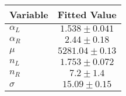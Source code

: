 \begin{tabular}[t]{lc}
\hline
Variable &Fitted Value\\
\hline\hline
$\alpha_L$&$1.538\pm0.041$\\
\hline
$\alpha_R$&$2.44\pm0.18$\\
\hline
$\mu$&$5281.04\pm0.13$\\
\hline
$n_L$&$1.753\pm0.072$\\
\hline
$n_R$&$7.2\pm1.4$\\
\hline
$\sigma$&$15.09\pm0.15$\\
\hline
\end{tabular}